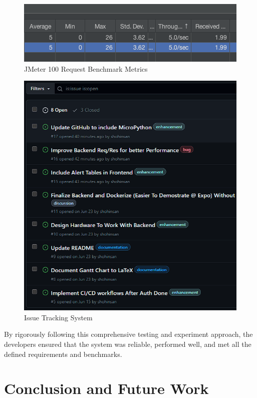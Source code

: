 \documentclass[conference]{IEEEtran}
\begin{document}
\begin{figure}[htbp]
      \centering
      \includegraphics[width=1\linewidth]{images/JMeter_100reqBenchmark.png}
      \caption{JMeter 100 Request Benchmark Metrics}
      \label{fig:figure3}
\end{figure}

\begin{figure}[htbp]
      \centering
      \includegraphics[width=1\linewidth]{images/GitHubIssues.png}
      \caption{Issue Tracking System}
      \label{fig:gitIssues}
\end{figure}

By rigorously following this comprehensive testing and experiment
approach, the developers ensured that the system was reliable,
performed well, and met all the defined requirements and benchmarks. %

\section{Conclusion and Future Work}
\end{document}
